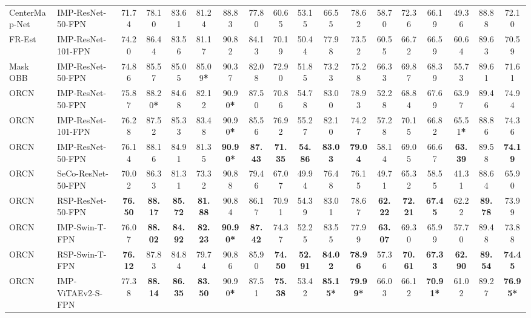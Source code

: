 \documentclass[10pt, journal,twoside]{IEEEtran}
\begin{document}
\begin{table*}[ht]
\begin{threeparttable}
{\begin{tabular}{l|l|c|c|c|c|c|c|c|c|c|c|c|c|c|c|c|c}
  CenterMap-Net \cite{centermapnet} & IMP-ResNet-50-FPN & 71.74 & 78.10 & 83.61 & 81.24 & 88.83 & 77.80 & 60.65 & 53.15 & 66.55 & 78.62 & 58.70  & 72.36 &  66.19 &  49.36 & 88.88 & 72.10 \\
  FR-Est \cite{aod_2021_tgrs_frest} & IMP-ResNet-101-FPN & 74.20 & 86.44 & 83.56 & 81.17 & 90.82 & 84.13 & 70.19 & 50.44 & 77.98 & 73.52 & 60.55 & 66.72 & 66.59 & 60.64 & 89.63 & 70.59 \\
  Mask OBB \cite{aod_2019_rs_maskobb} & IMP-ResNet-50-FPN & 74.86 & 85.57 & 85.05 & 85.09\textbf{*} & 90.37 & 82.08 & 72.90 & 51.85 & 73.23 & 75.28 & 66.33 & 69.87 & 68.39 & 55.73 & 89.61 & 71.61 \\
  ORCN  \cite{orcn} & IMP-ResNet-50-FPN & 75.87 & 88.20\textbf{*} & 84.68 & 82.12 & 90.90\textbf{*} & 87.50 & 70.86 & 54.78 & 83.00 & 78.93 & 52.28 & 68.84 & 67.69 & 63.97 & 89.46 & 74.94 \\ 
  ORCN  \cite{orcn} & IMP-ResNet-101-FPN & 76.28 & 87.52 & 85.33 & 83.48 & 90.90\textbf{*} & 85.56 & 76.92 & 55.27 & 82.10 & 74.27 & 57.28 & 70.15 & 66.82 & 65.51\textbf{*} & 88.86 & 74.36 \\
  \hline
  ORCN & IMP-ResNet-50-FPN & 76.14 & 88.16 & 84.91 & 81.35 & \bfseries 90.90\textbf{*} & \bfseries 87.43 & \bfseries 71.35 & \bfseries 54.86 & \bfseries 83.03 & \bfseries 79.04 & 58.14 & 69.05 & 66.67 & \bfseries 63.39 &89.58  & \bfseries 74.19 \\
  ORCN & SeCo-ResNet-50-FPN & 70.02 & 86.33 & 81.31 & 73.32 &  90.88  & 79.46 & 67.07 & 49.94 & 76.48 & 76.15 & 49.71 & 65.32 & 58.55 & 41.31 &88.64 & 65.90 \\
  ORCN & RSP-ResNet-50-FPN & \bfseries 76.50  & \bfseries 88.17 & \bfseries 85.72 & \bfseries 81.88 & 90.84 & 86.17 & 70.91 & 54.39 & 83.01 & 78.67 & \bfseries 62.22 & \bfseries 72.21 &  \bfseries 67.45& 62.22& \bfseries 89.78 & 73.99 \\
  \hline
  ORCN & IMP-Swin-T-FPN & 76.07 & \bfseries 88.02 & \bfseries 84.92 & \bfseries 82.23 & \bfseries 90.90\textbf{*} & \bfseries 87.42 & 74.37 & 52.25 & 83.55 & 77.99 & \bfseries 63.07 & 69.30 & 65.99 & 57.70 & 89.48 & 73.88 \\
  ORCN & RSP-Swin-T-FPN & \bfseries 76.12 & 87.83 & 84.84 & 79.74 & 90.86 & 85.90 & \bfseries 74.50 & \bfseries 52.91 & \bfseries 84.02 & \bfseries 78.96 & 57.36 & \bfseries 70.61 &  \bfseries 67.33 & \bfseries 62.90 & \bfseries 89.54 & \bfseries 74.45 \\
  \hline
  ORCN & IMP-ViTAEv2-S-FPN & 77.38 & \bfseries 88.14 & \bfseries 86.35 & \bfseries 83.50 & 90.90\textbf{*} & 87.51 & \bfseries 75.38 & 53.42 & \bfseries 85.15\textbf{*} & \bfseries 79.99\textbf{*} & 66.03 & 66.12 & \bfseries 70.91\textbf{*} & 61.02 & 89.27 & \bfseries 76.95\textbf{*}  \\

\end{tabular}}
\end{threeparttable}
\end{table*}
\end{document}
